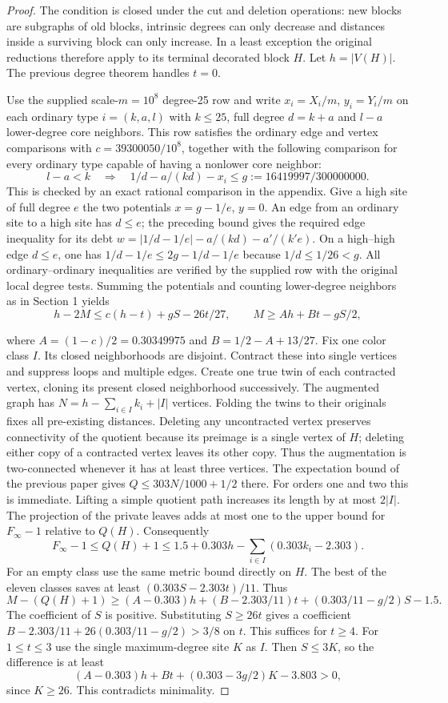\documentclass[11pt,a4paper]{article}
\begin{document}
\begin{proof}
The condition is closed under the cut and deletion operations: new blocks are subgraphs of old blocks, intrinsic degrees can only decrease and distances inside a surviving block can only increase. In a least exception the original reductions therefore apply to its terminal decorated block $H$. Let $h=|V(H)|$. The previous degree theorem handles $t=0$.

Use the supplied scale-$m=10^8$ degree-25 row and write $x_i=X_i/m$, $y_i=Y_i/m$ on each ordinary type $i=(k,a,l)$ with $k\le25$, full degree $d=k+a$ and $l-a$ lower-degree core neighbors. This row satisfies the ordinary edge and vertex comparisons with $c=39300050/10^8$, together with the following comparison for every ordinary type capable of having a nonlower core neighbor:
\[
 l-a<k\quad\Longrightarrow\quad
 1/d-a/(kd)-x_i\le g:=16419997/300000000 .
\]
This is checked by an exact rational comparison in the appendix. Give a high site of full degree $e$ the two potentials $x=g-1/e$, $y=0$. An edge from an ordinary site to a high site has $d\le e$; the preceding bound gives the required edge inequality for its debt $w=|1/d-1/e|-a/(kd)-a'/(k'e)$. On a high--high edge $d\le e$, one has $1/d-1/e\le2g-1/d-1/e$ because $1/d\le1/26<g$. All ordinary--ordinary inequalities are verified by the supplied row with the original local degree tests. Summing the potentials and counting lower-degree neighbors as in Section 1 yields
\[
 h-2M\le c(h-t)+gS-26t/27,
 \qquad M\ge Ah+B t-gS/2 ,
\]

where $A=(1-c)/2=0.30349975$ and $B=1/2-A+13/27$. Fix one color class $I$. Its closed neighborhoods are disjoint. Contract these into single vertices and suppress loops and multiple edges. Create one true twin of each contracted vertex, cloning its present closed neighborhood successively. The augmented graph has $N=h-\sum_{i\in I}k_i+|I|$ vertices. Folding the twins to their originals fixes all pre-existing distances. Deleting any uncontracted vertex preserves connectivity of the quotient because its preimage is a single vertex of $H$; deleting either copy of a contracted vertex leaves its other copy. Thus the augmentation is two-connected whenever it has at least three vertices. The expectation bound of the previous paper gives $Q\le303N/1000+1/2$ there. For orders one and two this is immediate. Lifting a simple quotient path increases its length by at most $2|I|$. The projection of the private leaves adds at most one to the upper bound for $F_\infty-1$ relative to $Q(H)$. Consequently
\[
 F_\infty-1\le Q(H)+1\le1.5+0.303h-
       \sum_{i\in I}(0.303k_i-2.303).
\]
For an empty class use the same metric bound directly on $H$. The best of the eleven classes saves at least $(0.303S-2.303t)/11$. Thus
\[
 M-(Q(H)+1)\ge
 (A-0.303)h+(B-2.303/11)t+(0.303/11-g/2)S-1.5 .
\]
The coefficient of $S$ is positive. Substituting $S\ge26t$ gives a coefficient $B-2.303/11+26(0.303/11-g/2)>3/8$ on $t$. This suffices for $t\ge4$. For $1\le t\le3$ use the single maximum-degree site $K$ as $I$. Then $S\le3K$, so the difference is at least
\[
 (A-0.303)h + B t +(0.303-3g/2)K-3.803>0,
\]
since $K\ge26$. This contradicts minimality.
\end{proof}
\end{document}
